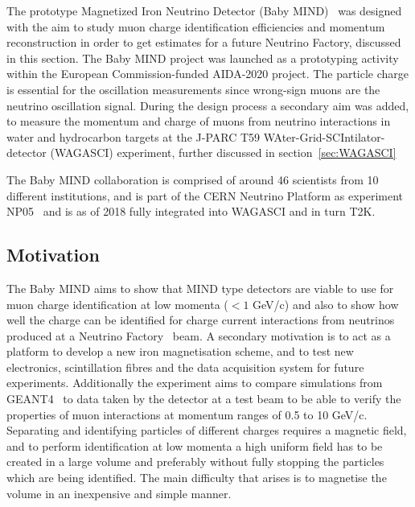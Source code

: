 
The prototype Magnetized Iron Neutrino Detector (Baby MIND)~\cite{26babyMIND} was designed with the aim to study muon charge identification efficiencies and momentum reconstruction in order to get estimates for a future Neutrino Factory, discussed in this section. The Baby MIND project was launched as a prototyping activity within the European Commission-funded AIDA-2020 project. The particle charge is essential for the oscillation measurements since wrong-sign muons are the neutrino oscillation signal. During the design process a secondary aim was added, to measure the momentum and charge of muons from neutrino interactions in water and hydrocarbon targets at the J-PARC T59 WAter-Grid-SCIntilator-detector (WAGASCI) experiment, further discussed in section~\ref{sec:WAGASCI}

The Baby MIND collaboration is comprised of around 46 scientists from 10 different institutions, and is part of the CERN Neutrino Platform as experiment NP05~\cite{Fix2} and is as of 2018 fully integrated into WAGASCI and in turn T2K.

\subsection{Motivation}

The Baby MIND aims to show that MIND type detectors are viable to use for muon charge identification at low momenta ($<1$ GeV/c) and also to show how well the charge can be identified for charge current interactions from neutrinos produced at a Neutrino Factory~\cite{25NUfact} beam. A secondary motivation is to act as a platform to develop a new iron magnetisation scheme, and to test new electronics, scintillation fibres and the data acquisition system for future experiments. Additionally the experiment aims to compare simulations from GEANT4~\cite{Geant4} to data taken by the detector at a test beam to be able to verify the properties of muon interactions at momentum ranges of 0.5 to 10 GeV/c. Separating and identifying particles of different charges requires a magnetic field, and to perform identification at low momenta a high uniform field has to be created in a large volume and preferably without fully stopping the particles which are being identified. 
The main difficulty that arises is to magnetise the volume in an inexpensive and simple manner.

